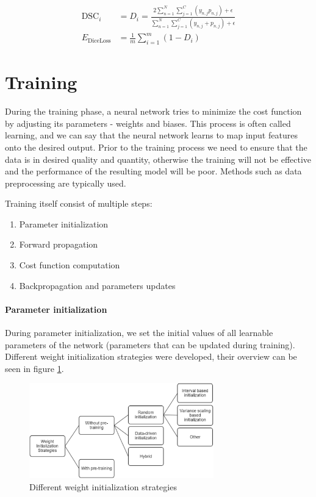 \begin{align}
\label{eq:dsc}
\text{DSC}_i &= D_i = \frac{2 \sum_{n=1}^N \sum_{j=1}^C (y_{n,j} p_{n,j}) + \epsilon}{\sum_{n=1}^N\sum_{j=1}^C (y_{n,j} + p_{n,j}) + \epsilon} \\
\label{eq:diceloss}
E_\text{DiceLoss} &= \frac{1}{m}\sum_{i=1}^m (1-D_i)
\end{align}

\section{Training}
During the training phase, a neural network tries to minimize the cost function by adjusting its parameters - weights and biases. This process is often called learning, and we can say that the neural network learns to map input features onto the desired output. Prior to the training process we need to ensure that the data is in desired quality and quantity, otherwise the training will not be effective and the performance of the resulting model will be poor. Methods such as data preprocessing are typically used. 

Training itself consist of multiple steps:

\begin{enumerate}
    \item Parameter initialization
    \item Forward propagation
    \item Cost function computation
    \item Backpropagation and parameters updates
\end{enumerate}

\paragraph{Parameter initialization} During parameter initialization, we set the initial values of all learnable parameters of the network (parameters that can be updated during training). Different weight initialization strategies were developed, their overview can be seen in figure \ref{fig:init}.

\begin{figure}[H]
\begin{centering}
\includegraphics[width=8cm]{assets/images/init.png}
\par\end{centering}
\caption{Different weight initialization strategies \cite{Narkhede2021}}
\label{fig:init}
\end{figure}

